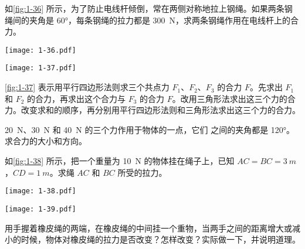 \begin{Exercise}
\begin{question}
\item 如\cref{fig:1-36} 所示，为了防止电线杆倾倒，常在两侧对称地拉上钢绳。如果两条钢绳间的夹角是 \ang{60}，每条钢绳的拉力都是 \qty{300}{N}，求两条钢绳作用在电线杆上的合力。
\begin{center}
\begin{minipage}[b]{0.48\linewidth}
  \centering
  \texttt{[image: 1-36.pdf]}
  \label{fig:1-36}
\end{minipage}
\begin{minipage}[b]{0.48\linewidth}
  \centering
  \texttt{[image: 1-37.pdf]}
  \label{fig:1-37}
\end{minipage}
\end{center}
\item  \cref{fig:1-37} 表示用平行四边形法则求三个共点力 $F_1$、$F_2$、$F_3$ 的合力 $F$。先求出 $F_1$ 和 $F_2$ 的合力，再求出这个合力与 $F_3$ 的合力 $F$。改用三角形法求出这三个力的合力。改变求和的顺序，再分别用平行四边形法则和三角形法求出这三个力的合力。
\item   \qty{20}{N}、\qty{30}{N} 和 \qty{40}{N} 的三个力作用于物体的一点，它们
之间的夹角都是 \ang{120}。求合力的大小和方向。
\item 如\cref{fig:1-38} 所示，把一个重量为 \qty{10}{N} 的物体挂在绳子上，已知 $AC=BC=\qty{3}{m}$，$CD=\qty{1}{m}$。求绳 $AC$ 和 $BC$ 所受的拉力。
\begin{figurehere}
  \begin{minipage}[b]{0.5\linewidth}\centering
    \texttt{[image: 1-38.pdf]}
    \caption{}\label{fig:1-38} 
  \end{minipage}
  \begin{minipage}[b]{0.48\linewidth}
    \centering
    \texttt{[image: 1-39.pdf]}
    \caption{}\label{fig:1-39}
  \end{minipage}
\end{figurehere}
\item   用手握着橡皮绳的两端，在橡皮绳的中间挂一个重物，当两手之间的距离增大或减小的时候，物体对橡皮绳的拉力是否改变？怎样改变？实际做一下，并说明道理。


\end{question}
\end{Exercise}
